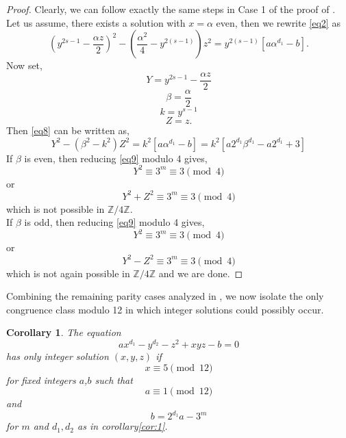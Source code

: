 \documentclass[12pt, reqno]{amsart}
\newtheorem{corollary}[thm]{Corollary}
\numberwithin{equation}{section}
\theoremstyle{definition}
\theoremstyle{nodefstyle}
\begin{document}
\begin{proof}
    Clearly, we can follow exactly the same steps in Case 1 of the proof of .\\
    Let us assume, there exists a solution with $x= \alpha$ even, then we rewrite \eqref{eq2} as
    \begin{equation}
        \left( y^{2s-1}-\frac{\alpha z}{2}\right)^2-\left( \frac{\alpha ^2}{4}-y^{2(s-1)}\right)z^2=y^{2(s-1)}[ a\alpha ^{d_1}-b].  \label{eq8}
    \end{equation}
    Now set,
    \begin{equation*}
    Y= y^{2s-1}-\frac{\alpha z}{2}
    \end{equation*}
    \begin{equation*}
        \beta= \frac{\alpha}{2}
    \end{equation*}
    \begin{equation*}
        k=y^{s-1}
    \end{equation*}
    \begin{equation*}
        Z=z.
    \end{equation*}
    Then \eqref{eq8} can be written as,
    \begin{equation}
    Y^2-\left(\beta ^2-k^2\right )Z^2=k^2\left[ a\alpha ^{d_1}-b\right] = k^2\left[a2^{d_1}\beta ^{d_1}-a2^{d_1}+3\right] \label{eq9}
    \end{equation}
    If $\beta$ is even, then reducing \eqref{eq9} modulo 4 gives,
    \begin{equation*}
        Y^2 \equiv 3^m \equiv 3 \pmod{4} 
    \end{equation*} or 
    \begin{equation}
        Y^2+Z^2 \equiv 3^m \equiv 3 \pmod{4}
    \end{equation}
    which is not possible in $\mathbb{Z}/{4\mathbb{Z}}$.\\
    If $\beta$ is odd, then reducing \eqref{eq9} modulo 4 gives,
    \[Y^2 \equiv 3^m \equiv 3 \pmod{4}\] or
    \begin{equation}
        Y^2-Z^2 \equiv 3^m \equiv 3 \pmod{4}
    \end{equation}
    which is not again possible in $\mathbb{Z}/{4\mathbb{Z}}$ and we are done.
    \vspace{2mm}
\end{proof}

\vspace{5mm}

Combining the remaining parity cases analyzed in , we now isolate the only
congruence class modulo 12 in which integer solutions could possibly occur.
\begin{corollary}
    The equation \[ax^{d_1}-y^{d_2}-z^2+xyz-b=0\] has only integer solution $(x,y,z)$ if 
    \[x \equiv 5 \pmod{12}\] for fixed integers $a$,$b$ such that \[a\equiv 1 \pmod{12}\] and \[b=2^{d_1}a-3^m\] for $m$ and $d_1, d_2$
 as in corollary\autoref{cor:1}.
 \end{corollary}
\end{document}
